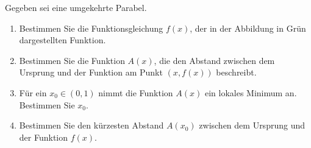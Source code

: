 \begin{ExerciseBlock}
Gegeben sei eine umgekehrte Parabel.

\begin{center}
\end{center}

\begin{enumerate}[label=\alph*)]
	
	\item Bestimmen Sie die Funktionsgleichung $f(x)$, der in der Abbildung in Grün dargestellten Funktion.
	
	\item Bestimmen Sie die Funktion $A(x)$, die den Abstand zwischen dem Ursprung und der Funktion am Punkt $(x,f(x))$ beschreibt.
	
	\item Für ein $x_0 \in (0,1)$ nimmt die Funktion $A(x)$ ein lokales Minimum an. Bestimmen Sie $x_0$. 
	
	\item Bestimmen Sie den kürzesten Abstand $A(x_0)$ zwischen dem Ursprung und der Funktion $f(x)$.
\end{enumerate}	

\end{ExerciseBlock}

